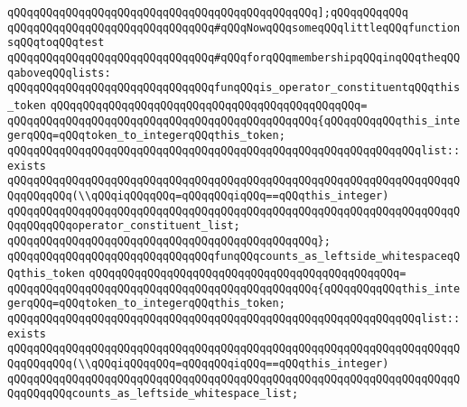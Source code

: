 \verb|qQQqqQQqqQQqqQQqqQQqqQQqqQQqqQQqqQQqqQQqqQQqqQQq];qQQqqQQqqQQq|\newline
\newline
\verb|qQQqqQQqqQQqqQQqqQQqqQQqqQQqqQQq#qQQqNowqQQqsomeqQQqlittleqQQqfunctionsqQQqtoqQQqtest|\newline
\verb|qQQqqQQqqQQqqQQqqQQqqQQqqQQqqQQq#qQQqforqQQqmembershipqQQqinqQQqtheqQQqaboveqQQqlists:|\newline
\newline
\verb|qQQqqQQqqQQqqQQqqQQqqQQqqQQqqQQqfunqQQqis_operator_constituentqQQqthis_token|\newline
\verb|qQQqqQQqqQQqqQQqqQQqqQQqqQQqqQQqqQQqqQQqqQQqqQQq=|\newline
\verb|qQQqqQQqqQQqqQQqqQQqqQQqqQQqqQQqqQQqqQQqqQQqqQQq{qQQqqQQqqQQqthis_integerqQQq=qQQqtoken_to_integerqQQqthis_token;|\newline
\newline
\verb|qQQqqQQqqQQqqQQqqQQqqQQqqQQqqQQqqQQqqQQqqQQqqQQqqQQqqQQqqQQqqQQqlist::exists|\newline
\verb|qQQqqQQqqQQqqQQqqQQqqQQqqQQqqQQqqQQqqQQqqQQqqQQqqQQqqQQqqQQqqQQqqQQqqQQqqQQqqQQq(\\qQQqiqQQqqQQq=qQQqqQQqiqQQq==qQQqthis_integer)|\newline
\verb|qQQqqQQqqQQqqQQqqQQqqQQqqQQqqQQqqQQqqQQqqQQqqQQqqQQqqQQqqQQqqQQqqQQqqQQqqQQqqQQqoperator_constituent_list;|\newline
\verb|qQQqqQQqqQQqqQQqqQQqqQQqqQQqqQQqqQQqqQQqqQQqqQQq};|\newline
\newline
\verb|qQQqqQQqqQQqqQQqqQQqqQQqqQQqqQQqfunqQQqcounts_as_leftside_whitespaceqQQqthis_token|\newline
\verb|qQQqqQQqqQQqqQQqqQQqqQQqqQQqqQQqqQQqqQQqqQQqqQQq=|\newline
\verb|qQQqqQQqqQQqqQQqqQQqqQQqqQQqqQQqqQQqqQQqqQQqqQQq{qQQqqQQqqQQqthis_integerqQQq=qQQqtoken_to_integerqQQqthis_token;|\newline
\newline
\verb|qQQqqQQqqQQqqQQqqQQqqQQqqQQqqQQqqQQqqQQqqQQqqQQqqQQqqQQqqQQqqQQqlist::exists|\newline
\verb|qQQqqQQqqQQqqQQqqQQqqQQqqQQqqQQqqQQqqQQqqQQqqQQqqQQqqQQqqQQqqQQqqQQqqQQqqQQqqQQq(\\qQQqiqQQqqQQq=qQQqqQQqiqQQq==qQQqthis_integer)|\newline
\verb|qQQqqQQqqQQqqQQqqQQqqQQqqQQqqQQqqQQqqQQqqQQqqQQqqQQqqQQqqQQqqQQqqQQqqQQqqQQqqQQqcounts_as_leftside_whitespace_list;|\newline

